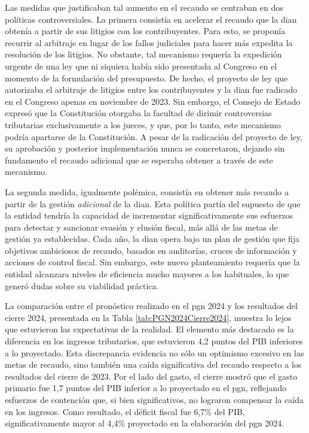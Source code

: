 Las medidas que justificaban tal aumento en el recaudo se centraban en dos políticas controversiales. La primera consistía en acelerar el recaudo que la \gls{dian} obtenía a partir de sus litigios con los contribuyentes. Para esto, se proponía recurrir al arbitraje en lugar de los fallos judiciales para hacer más expedita la resolución de los litigios. No obstante, tal mecanismo requería la expedición urgente de una ley que ni siquiera había sido presentada al Congreso en el momento de la formulación del presupuesto. De hecho, el proyecto de ley que autorizaba el arbitraje de litigios entre los contribuyentes y la \gls{dian} fue radicado en el Congreso apenas en noviembre de 2023. Sin embargo, el Consejo de Estado expresó que la Constitución otorgaba la facultad de dirimir controversias tributarias exclusivamente a los jueces, y que, por lo tanto, este mecanismo podría apartarse de la Constitución. A pesar de la radicación del proyecto de ley, su aprobación y posterior implementación nunca se concretaron, dejando sin fundamento el recaudo adicional que se esperaba obtener a través de este mecanismo.

La segunda medida, igualmente polémica, consistía en obtener más recaudo a partir de la gestión \textit{adicional} de la \gls{dian}. Esta política partía del supuesto de que la entidad tendría la capacidad de incrementar significativamente sus esfuerzos para detectar y sancionar evasión y elusión fiscal, más allá de las metas de gestión ya establecidas. Cada año, la \gls{dian} opera bajo un plan de gestión que fija objetivos ambiciosos de recaudo, basados en auditorías, cruces de información y acciones de control fiscal. Sin embargo, este nuevo planteamiento requería que la entidad alcanzara niveles de eficiencia mucho mayores a los habituales, lo que generó dudas sobre su viabilidad práctica.



La comparación entre el pronóstico realizado en el \gls{pgn} 2024 y los resultados del cierre 2024, presentada en la Tabla \ref{tab:PGN2024Cierre2024}, muestra lo lejos que estuvieron las expectativas de la realidad. El elemento más destacado es la diferencia en los ingresos tributarios, que estuvieron 4,2 puntos del PIB inferiores a lo proyectado. Esta discrepancia evidencia no sólo un optimismo excesivo en las metas de recaudo, sino también una caída significativa del recaudo respecto a los resultados del cierre de 2023. Por el lado del gasto, el cierre mostró que el gasto primario fue 1,7 puntos del PIB inferior a lo proyectado en el \gls{pgn}, reflejando esfuerzos de contención que, si bien significativos, no lograron compensar la caída en los ingresos. Como resultado, el déficit fiscal fue 6,7\% del PIB, significativamente mayor al 4,4\% proyectado en la elaboración del \gls{pgn} 2024. 

